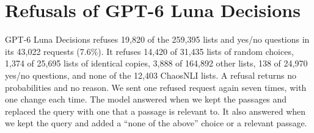 \section{Refusals of GPT-6 Luna Decisions}
\label{app:refusals}
GPT-6 Luna Decisions refuses 19,820 of the 259,395 lists and yes/no questions in its 43,022 requests (7.6\%). It refuses 14,420 of 31,435 lists of random choices, 1,374 of 25,695 lists of identical copies, 3,888 of 164,892 other lists, 138 of 24,970 yes/no questions, and none of the 12,403 ChaosNLI lists. A refusal returns no probabilities and no reason. We sent one refused request again seven times, with one change each time. The model answered when we kept the passages and replaced the query with one that a passage is relevant to. It also answered when we kept the query and added a ``none of the above'' choice or a relevant passage.
